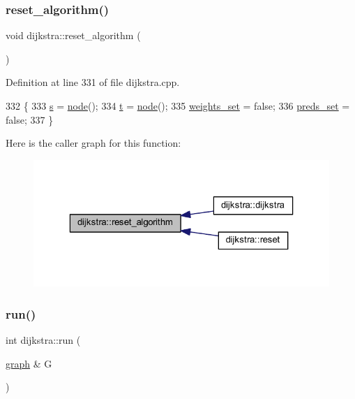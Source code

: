 \subsubsection{\texorpdfstring{reset\+\_\+algorithm()}{reset\_algorithm()}}
{\footnotesize\ttfamily void dijkstra\+::reset\+\_\+algorithm (\begin{DoxyParamCaption}{ }\end{DoxyParamCaption})\hspace{0.3cm}{\ttfamily [private]}}



Definition at line 331 of file dijkstra.\+cpp.


\begin{DoxyCode}
332 \{
333     \mbox{\hyperlink{classdijkstra_a721bfb648626a1be2b9d276d85ebdb9d}{s}} = \mbox{\hyperlink{classnode}{node}}();
334     \mbox{\hyperlink{classdijkstra_a6c42e614aabfbef25b5acfb543fbe1d1}{t}} = \mbox{\hyperlink{classnode}{node}}();
335     \mbox{\hyperlink{classdijkstra_ad60e0abd80def985afa753b7dadef771}{weights\_set}} = \textcolor{keyword}{false};
336     \mbox{\hyperlink{classdijkstra_aaba530e703b5d4005b3c01fa1a11182d}{preds\_set}} = \textcolor{keyword}{false};
337 \}
\end{DoxyCode}
Here is the caller graph for this function\+:\nopagebreak
\begin{figure}[H]
\begin{center}
\leavevmode
\includegraphics[width=323pt]{classdijkstra_a70bec540a7f67970a9f19b60c5cbaedd_icgraph}
\end{center}
\end{figure}
\mbox{\label{classdijkstra_a7b30f3d8ad42baae27989bc14befe0d0}} 
\subsubsection{\texorpdfstring{run()}{run()}}
{\footnotesize\ttfamily int dijkstra\+::run (\begin{DoxyParamCaption}\item[{\mbox{\hyperlink{classgraph}{graph}} \&}]{G }\end{DoxyParamCaption})\hspace{0.3cm}{\ttfamily [virtual]}}



